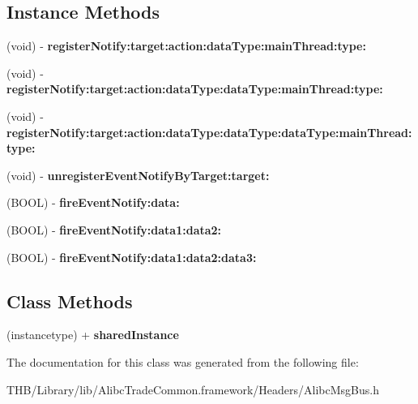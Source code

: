 \subsection*{Instance Methods}
\begin{DoxyCompactItemize}
\item 
\mbox{\label{interface_alibc_msg_bus_ac577a1acf533257c2c6b1eb2ba89970f}} 
(void) -\/ {\bfseries register\+Notify\+:target\+:action\+:data\+Type\+:main\+Thread\+:type\+:}
\item 
\mbox{\label{interface_alibc_msg_bus_a09f90bfcc2e1cfccc676ffee4562a457}} 
(void) -\/ {\bfseries register\+Notify\+:target\+:action\+:data\+Type\+:data\+Type\+:main\+Thread\+:type\+:}
\item 
\mbox{\label{interface_alibc_msg_bus_a131c045934e6d90b8fa3b61d7fd8e2eb}} 
(void) -\/ {\bfseries register\+Notify\+:target\+:action\+:data\+Type\+:data\+Type\+:data\+Type\+:main\+Thread\+:type\+:}
\item 
\mbox{\label{interface_alibc_msg_bus_a775f423ddcc0f54cd3534f35481654f0}} 
(void) -\/ {\bfseries unregister\+Event\+Notify\+By\+Target\+:target\+:}
\item 
\mbox{\label{interface_alibc_msg_bus_aca34d91a32d0d4fcb1ade1ee8860facf}} 
(B\+O\+OL) -\/ {\bfseries fire\+Event\+Notify\+:data\+:}
\item 
\mbox{\label{interface_alibc_msg_bus_a69df7529ac0b01fc363c86a31ece6a72}} 
(B\+O\+OL) -\/ {\bfseries fire\+Event\+Notify\+:data1\+:data2\+:}
\item 
\mbox{\label{interface_alibc_msg_bus_ae9482de98963793780e2bf619bc8ff91}} 
(B\+O\+OL) -\/ {\bfseries fire\+Event\+Notify\+:data1\+:data2\+:data3\+:}
\end{DoxyCompactItemize}
\subsection*{Class Methods}
\begin{DoxyCompactItemize}
\item 
\mbox{\label{interface_alibc_msg_bus_a62829c200eeb13b0c88f140df5baad6a}} 
(instancetype) + {\bfseries shared\+Instance}
\end{DoxyCompactItemize}


The documentation for this class was generated from the following file\+:\begin{DoxyCompactItemize}
\item 
T\+H\+B/\+Library/lib/\+Alibc\+Trade\+Common.\+framework/\+Headers/Alibc\+Msg\+Bus.\+h\end{DoxyCompactItemize}
